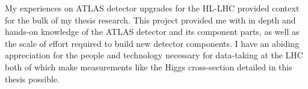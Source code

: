 My experiences on ATLAS detector upgrades for the HL-LHC provided context for the bulk of my thesis research. This project provided me with in depth and hands-on knowledge of the ATLAS detector and its component parts, as well as the scale of effort required to build new detector components. I have an abiding appreciation for the people and technology necessary for data-taking at the LHC both of which make measurements like the Higgs cross-section detailed in this thesis possible.
